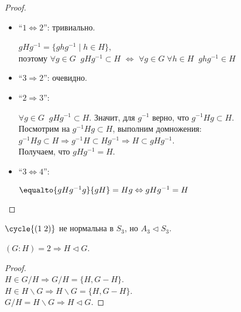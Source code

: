 \begin{proof} $ $

    \begin{itemize}
        \item ``$1 \Leftrightarrow 2$'': тривиально.
        
        $gHg^{-1} = \{ghg^{-1} \mid h \in H\}$, \\
        поэтому
        $\forall g \in G \;\; gHg^{-1} \subset H$
        $\Longleftrightarrow $
        $\forall g \in G \; \forall h \in H \;\;
        ghg^{-1} \in H$

        \item ``$3 \Rightarrow 2$'': очевидно.
        
        \item ``$2 \Rightarrow 3$'':
        
        $\forall g \in G \;\; gHg^{-1} \subset H$.
        Значит, для $g^{-1}$ верно, что $g^{-1}Hg \subset H$. \\
        Посмотрим на $g^{-1}Hg \subset H$, выполним домножения: \\
        $g^{-1}Hg \subset H \Rightarrow g^{-1}H \subset Hg^{-1}
        \Rightarrow H \subset gHg^{-1}$. \\
        Получаем, что $gHg^{-1} = H$.

        \item ``$3 \Leftrightarrow 4$'':
        
        $\equalto{gHg^{-1}g}{gH} = Hg \Leftrightarrow gHg^{-1} = H$
    \end{itemize}
\end{proof}

\begin{example}
    $\cycle {(1 \; 2)}$ не нормальна в $S_3$, но $A_3 \lhd S_3$.
\end{example}

\notice $(G : H) = 2 \Rightarrow H \lhd G$.
\begin{proof} $ $\\
    $H \in G/H \Rightarrow G/H = \{H, G - H\}$.\\
    $H \in H\backslash G \Rightarrow 
    H\backslash G = \{H, G - H\}$.\\
    $G/H = H\backslash G \Rightarrow H \lhd G$.
\end{proof}


